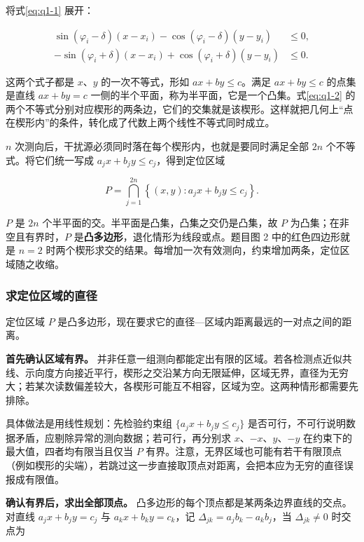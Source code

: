 \documentclass[UTF8,a4paper,zihao=5,fontset=fandol]{ctexart}
\begin{document}
将式\eqref{eq:q1-1} 展开：

\begin{equation}\label{eq:q1-2}
\begin{aligned}
\sin(\varphi_i-\delta)(x-x_i)-\cos(\varphi_i-\delta)(y-y_i)&\le 0,\\
-\sin(\varphi_i+\delta)(x-x_i)+\cos(\varphi_i+\delta)(y-y_i)&\le 0.
\end{aligned}
\end{equation}

这两个式子都是 $x$、$y$ 的一次不等式，形如 $ax+by\le c$。满足 $ax+by\le c$ 的点集是直线 $ax+by=c$ 一侧的半个平面，称为半平面，它是一个凸集。式\eqref{eq:q1-2} 的两个不等式分别对应楔形的两条边，它们的交集就是该楔形。这样就把几何上“点在楔形内”的条件，转化成了代数上两个线性不等式同时成立。

$n$ 次测向后，干扰源必须同时落在每个楔形内，也就是要同时满足全部 $2n$ 个不等式。将它们统一写成 $a_jx+b_jy\le c_j$，得到定位区域

\begin{equation}\label{eq:q1-3}
P=\bigcap_{j=1}^{2n}\left\{(x,y):a_jx+b_jy\le c_j\right\}.
\end{equation}

$P$ 是 $2n$ 个半平面的交。半平面是凸集，凸集之交仍是凸集，故 $P$ 为凸集；在非空且有界时，$P$ 是\textbf{凸多边形}，退化情形为线段或点。题目图 2 中的红色四边形就是 $n=2$ 时两个楔形求交的结果。每增加一次有效测向，约束增加两条，定位区域随之收缩。

\subsubsection{求定位区域的直径}\label{sec:q1-2}

定位区域 $P$ 是凸多边形，现在要求它的直径---区域内距离最远的一对点之间的距离。

\textbf{首先确认区域有界。} 并非任意一组测向都能定出有限的区域。若各检测点近似共线、示向度方向接近平行，楔形之交沿某方向无限延伸，区域无界，直径为无穷大；若某次读数偏差较大，各楔形可能互不相容，区域为空。这两种情形都需要先排除。

具体做法是用线性规划：先检验约束组 $\{a_jx+b_jy\le c_j\}$ 是否可行，不可行说明数据矛盾，应剔除异常的测向数据；若可行，再分别求 $x$、$-x$、$y$、$-y$ 在约束下的最大值，四者均有限当且仅当 $P$ 有界。注意，无界区域也可能有若干有限顶点（例如楔形的尖端），若跳过这一步直接取顶点对距离，会把本应为无穷的直径误报成有限值。

\textbf{确认有界后，求出全部顶点。} 凸多边形的每个顶点都是某两条边界直线的交点。对直线 $a_jx+b_jy=c_j$ 与 $a_kx+b_ky=c_k$，记 $\Delta_{jk}=a_jb_k-a_kb_j$，当 $\Delta_{jk}\ne0$ 时交点为
\end{document}
